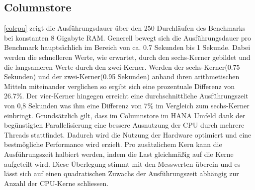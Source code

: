\subsection{Columnstore}

\begin{figure}[H]
\end{figure}


\autoref{colcpu} zeigt die Ausführungsdauer über den 250 Durchläufen des Benchmarks bei konstanten 8 Gigabyte RAM. Generell bewegt sich die Ausführungsdauer pro Benchmark hauptsächlich im Bereich von ca. 0.7 Sekunden bis 1 Sekunde. Dabei werden die schnelleren Werte, wie erwartet, durch den sechs-Kerner gebildet und die langsameren Werte durch den zwei-Kerner. Werden der sechs-Kerner(0.75 Sekunden) und der zwei-Kerner(0.95 Sekunden) anhand ihren arithmetischen Mitteln miteinander verglichen so ergibt sich eine prozentuale Differenz von 26.7\%. Der vier-Kerner hingegen erreicht eine durchschnittliche Ausführungszeit von 0,8 Sekunden was ihm eine Differenz von 7\% im Vergleich zum sechs-Kerner einbringt. 
Grundsätzlich gilt, dass im Columnstore im HANA Umfeld dank der begünstigten Parallelisierung eine bessere Ausnutzung der CPU durch mehrere Threads stattfindet. Dadurch wird die Nutzung der Hardware optimiert und eine bestmögliche Performance wird erzielt. Pro zusätzlichem Kern kann die Ausführungszeit halbiert werden, indem die Last gleichmäßig auf die Kerne aufgeteilt wird. Diese Überlegung stimmt mit den Messwerten überein und es lässt sich auf einen quadratischen Zuwachs der Ausführungszeit abhängig zur Anzahl der CPU-Kerne schliessen. 

